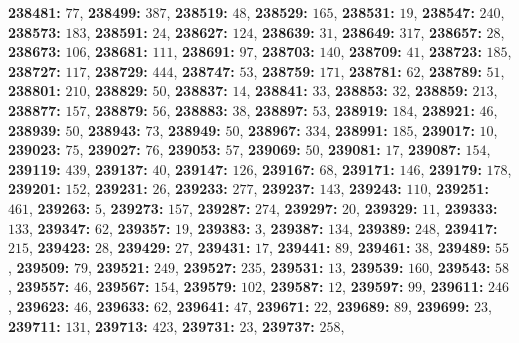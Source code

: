 \textsf{\bfseries 238481:} $77$, \textsf{\bfseries 238499:} $387$, \textsf{\bfseries 238519:} $48$, \textsf{\bfseries 238529:} $165$, \textsf{\bfseries 238531:} $19$, \textsf{\bfseries 238547:} $240$, \textsf{\bfseries 238573:} $183$, \textsf{\bfseries 238591:} $24$, \textsf{\bfseries 238627:} $124$, \textsf{\bfseries 238639:} $31$, \textsf{\bfseries 238649:} $317$, \textsf{\bfseries 238657:} $28$, \textsf{\bfseries 238673:} $106$, \textsf{\bfseries 238681:} $111$, \textsf{\bfseries 238691:} $97$, \textsf{\bfseries 238703:} $140$, \textsf{\bfseries 238709:} $41$, \textsf{\bfseries 238723:} $185$, \textsf{\bfseries 238727:} $117$, \textsf{\bfseries 238729:} $444$, \textsf{\bfseries 238747:} $53$, \textsf{\bfseries 238759:} $171$, \textsf{\bfseries 238781:} $62$, \textsf{\bfseries 238789:} $51$, \textsf{\bfseries 238801:} $210$, \textsf{\bfseries 238829:} $50$, \textsf{\bfseries 238837:} $14$, \textsf{\bfseries 238841:} $33$, \textsf{\bfseries 238853:} $32$, \textsf{\bfseries 238859:} $213$, \textsf{\bfseries 238877:} $157$, \textsf{\bfseries 238879:} $56$, \textsf{\bfseries 238883:} $38$, \textsf{\bfseries 238897:} $53$, \textsf{\bfseries 238919:} $184$, \textsf{\bfseries 238921:} $46$, \textsf{\bfseries 238939:} $50$, \textsf{\bfseries 238943:} $73$, \textsf{\bfseries 238949:} $50$, \textsf{\bfseries 238967:} $334$, \textsf{\bfseries 238991:} $185$, \textsf{\bfseries 239017:} $10$, \textsf{\bfseries 239023:} $75$, \textsf{\bfseries 239027:} $76$, \textsf{\bfseries 239053:} $57$, \textsf{\bfseries 239069:} $50$, \textsf{\bfseries 239081:} $17$, \textsf{\bfseries 239087:} $154$, \textsf{\bfseries 239119:} $439$, \textsf{\bfseries 239137:} $40$, \textsf{\bfseries 239147:} $126$, \textsf{\bfseries 239167:} $68$, \textsf{\bfseries 239171:} $146$, \textsf{\bfseries 239179:} $178$, \textsf{\bfseries 239201:} $152$, \textsf{\bfseries 239231:} $26$, \textsf{\bfseries 239233:} $277$, \textsf{\bfseries 239237:} $143$, \textsf{\bfseries 239243:} $110$, \textsf{\bfseries 239251:} $461$, \textsf{\bfseries 239263:} $5$, \textsf{\bfseries 239273:} $157$, \textsf{\bfseries 239287:} $274$, \textsf{\bfseries 239297:} $20$, \textsf{\bfseries 239329:} $11$, \textsf{\bfseries 239333:} $133$, \textsf{\bfseries 239347:} $62$, \textsf{\bfseries 239357:} $19$, \textsf{\bfseries 239383:} $3$, \textsf{\bfseries 239387:} $134$, \textsf{\bfseries 239389:} $248$, \textsf{\bfseries 239417:} $215$, \textsf{\bfseries 239423:} $28$, \textsf{\bfseries 239429:} $27$, \textsf{\bfseries 239431:} $17$, \textsf{\bfseries 239441:} $89$, \textsf{\bfseries 239461:} $38$, \textsf{\bfseries 239489:} $55$, \textsf{\bfseries 239509:} $79$, \textsf{\bfseries 239521:} $249$, \textsf{\bfseries 239527:} $235$, \textsf{\bfseries 239531:} $13$, \textsf{\bfseries 239539:} $160$, \textsf{\bfseries 239543:} $58$, \textsf{\bfseries 239557:} $46$, \textsf{\bfseries 239567:} $154$, \textsf{\bfseries 239579:} $102$, \textsf{\bfseries 239587:} $12$, \textsf{\bfseries 239597:} $99$, \textsf{\bfseries 239611:} $246$, \textsf{\bfseries 239623:} $46$, \textsf{\bfseries 239633:} $62$, \textsf{\bfseries 239641:} $47$, \textsf{\bfseries 239671:} $22$, \textsf{\bfseries 239689:} $89$, \textsf{\bfseries 239699:} $23$, \textsf{\bfseries 239711:} $131$, \textsf{\bfseries 239713:} $423$, \textsf{\bfseries 239731:} $23$, \textsf{\bfseries 239737:} $258$, 
